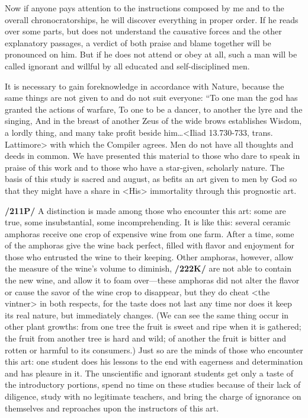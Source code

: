 Now if anyone pays attention to the instructions composed by me and to the overall chronocratorships, he will discover everything in proper order. If he reads over some parts, but does not understand the
causative forces and the other explanatory passages, a verdict of both praise and blame together will be pronounced on him. But if he does not attend or obey at all, such a man will be called ignorant and willful
by all educated and self-disciplined men.

It is necessary to gain foreknowledge in accordance with Nature, because the same things are not given to and do not suit everyone:
“To one man the god has granted the actions of warfare, To one to be a dancer, to another the lyre and the singing, And in the breast of another Zeus of the wide brows establishes Wisdom, a lordly thing, and many take profit beside him…<Iliad 13.730-733, trans. Lattimore> with which the Compiler agrees. Men do not have all thoughts and deeds in common. We have presented this material to those who dare to speak in praise of this work and to those who
have a star-given, scholarly nature. The basis of this study is sacred and august, as befits an art given to men by God so that they might have a share in <His> immortality through this prognostic art. 

\textbf{/211P/} A distinction is made among those who encounter this art: some are true, some insubstantial, some incomprehending. It is like this: several ceramic amphoras receive one crop of expensive wine from one farm. After a time, some of the amphoras give the wine back perfect, filled with flavor and enjoyment for those who entrusted the wine to their keeping. Other amphoras, however, allow the measure of the wine’s volume to diminish, \textbf{/222K/} are not able to contain the new wine, and allow it to foam over—these
amphoras did not alter the flavor or cause the savor of the wine crop to disappear, but they do cheat <the vintner> in both respects, for the taste does not last any time nor does it keep its real nature, but immediately changes. (We can see the same thing occur in other plant growths: from one tree the fruit is sweet and ripe when it is gathered; the fruit from another tree is hard and wild; of another the fruit is bitter and rotten or harmful to its consumers.) Just so are the minds of those who encounter this art: one student does his lessons to the end with eagerness and determination and has pleaure in it. The unscientific and ignorant students get only a taste of the introductory portions, spend no time on these studies because of
their lack of diligence, study with no legitimate teachers, and bring the charge of ignorance on themselves and reproaches upon the instructors of this art. 


